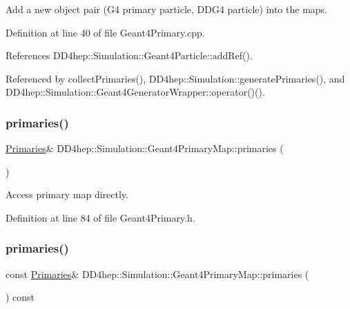 Add a new object pair (G4 primary particle, D\+D\+G4 particle) into the maps. 



Definition at line 40 of file Geant4\+Primary.\+cpp.



References D\+D4hep\+::\+Simulation\+::\+Geant4\+Particle\+::add\+Ref().



Referenced by collect\+Primaries(), D\+D4hep\+::\+Simulation\+::generate\+Primaries(), and D\+D4hep\+::\+Simulation\+::\+Geant4\+Generator\+Wrapper\+::operator()().

\hypertarget{class_d_d4hep_1_1_simulation_1_1_geant4_primary_map_a3c59e375ae3f9c00b5924a627cf73241}{}\label{class_d_d4hep_1_1_simulation_1_1_geant4_primary_map_a3c59e375ae3f9c00b5924a627cf73241} 
\subsubsection{\texorpdfstring{primaries()}{primaries()}\hspace{0.1cm}{\footnotesize\ttfamily [1/2]}}
{\footnotesize\ttfamily \hyperlink{class_d_d4hep_1_1_simulation_1_1_geant4_primary_map_aec80e9bb254e582ef410dc65da5809c3}{Primaries}\& D\+D4hep\+::\+Simulation\+::\+Geant4\+Primary\+Map\+::primaries (\begin{DoxyParamCaption}{ }\end{DoxyParamCaption})\hspace{0.3cm}{\ttfamily [inline]}}



Access primary map directly. 



Definition at line 84 of file Geant4\+Primary.\+h.

\hypertarget{class_d_d4hep_1_1_simulation_1_1_geant4_primary_map_a87d0e953580bc2dd2bd93a7db086bdb6}{}\label{class_d_d4hep_1_1_simulation_1_1_geant4_primary_map_a87d0e953580bc2dd2bd93a7db086bdb6} 
\subsubsection{\texorpdfstring{primaries()}{primaries()}\hspace{0.1cm}{\footnotesize\ttfamily [2/2]}}
{\footnotesize\ttfamily const \hyperlink{class_d_d4hep_1_1_simulation_1_1_geant4_primary_map_aec80e9bb254e582ef410dc65da5809c3}{Primaries}\& D\+D4hep\+::\+Simulation\+::\+Geant4\+Primary\+Map\+::primaries (\begin{DoxyParamCaption}{ }\end{DoxyParamCaption}) const\hspace{0.3cm}{\ttfamily [inline]}}



